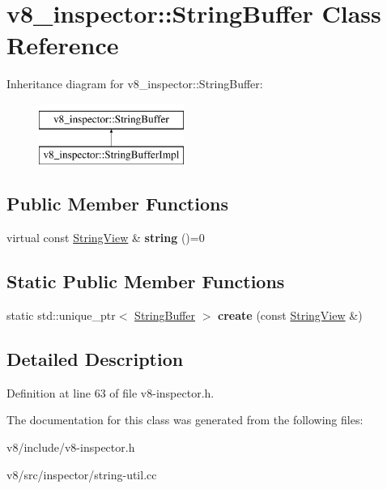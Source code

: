 \hypertarget{classv8__inspector_1_1StringBuffer}{}\section{v8\+\_\+inspector\+:\+:String\+Buffer Class Reference}
\label{classv8__inspector_1_1StringBuffer}
Inheritance diagram for v8\+\_\+inspector\+:\+:String\+Buffer\+:\begin{figure}[H]
\begin{center}
\leavevmode
\includegraphics[height=2.000000cm]{classv8__inspector_1_1StringBuffer}
\end{center}
\end{figure}
\subsection*{Public Member Functions}
\begin{DoxyCompactItemize}
\item 
\mbox{\label{classv8__inspector_1_1StringBuffer_a72806809fe0fc2d2ad3f52fe934e9e07}} 
virtual const \mbox{\hyperlink{classv8__inspector_1_1StringView}{String\+View}} \& {\bfseries string} ()=0
\end{DoxyCompactItemize}
\subsection*{Static Public Member Functions}
\begin{DoxyCompactItemize}
\item 
\mbox{\label{classv8__inspector_1_1StringBuffer_a5859775d5d14796846144e870b7f16c8}} 
static std\+::unique\+\_\+ptr$<$ \mbox{\hyperlink{classv8__inspector_1_1StringBuffer}{String\+Buffer}} $>$ {\bfseries create} (const \mbox{\hyperlink{classv8__inspector_1_1StringView}{String\+View}} \&)
\end{DoxyCompactItemize}


\subsection{Detailed Description}


Definition at line 63 of file v8-\/inspector.\+h.



The documentation for this class was generated from the following files\+:\begin{DoxyCompactItemize}
\item 
v8/include/v8-\/inspector.\+h\item 
v8/src/inspector/string-\/util.\+cc\end{DoxyCompactItemize}

